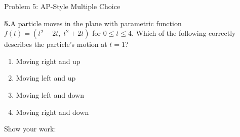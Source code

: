 \documentclass[10pt]{article}
\begin{document}
\vspace{0.08in}

\begin{notesbox}{Problem 5: AP-Style Multiple Choice}

\textbf{5.}\quad A particle moves in the plane with parametric function
$f(t) = (t^2 - 2t,\; t^2 + 2t)$ for $0 \le t \le 4$.
Which of the following correctly describes the particle's motion at $t = 1$?

\vspace{6pt}
\begin{enumerate}[label=(\Alph*), leftmargin=1.8em, itemsep=4pt]
  \item Moving right and up
  \item Moving left and up
  \item Moving left and down
  \item Moving right and down
\end{enumerate}

\vspace{4pt}
Show your work:


\end{notesbox}
\end{document}
